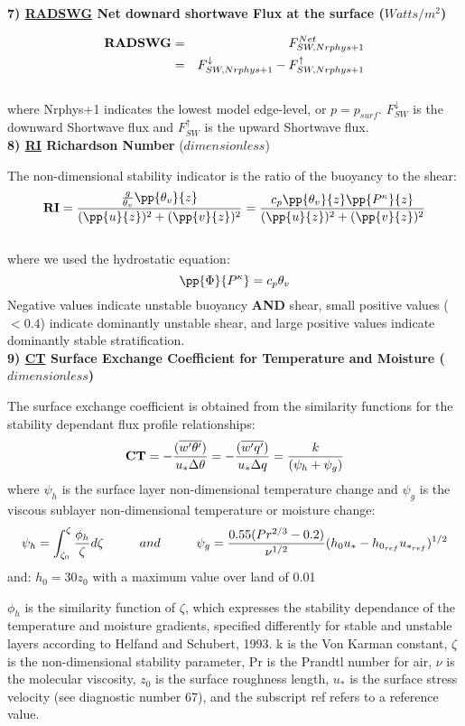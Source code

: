 {\bf 7) \underline {RADSWG} Net downard shortwave Flux at the surface ($Watts/m^2$)}

\begin{eqnarray*}
{\bf RADSWG} & =  & F_{SW,Nrphys+1}^{Net} \\
             & =  & F_{SW,Nrphys+1}^\downarrow - F_{SW,Nrphys+1}^\uparrow
\end{eqnarray*}
\\
where Nrphys+1 indicates the lowest model edge-level, or $p = p_{surf}$.
$F_{SW}^\downarrow$ is
the downward Shortwave flux and $F_{SW}^\uparrow$ is the upward Shortwave flux.
\\


\noindent
{\bf 8)  \underline {RI} Richardson Number} ($dimensionless$)

\noindent
The non-dimensional stability indicator is the ratio of the buoyancy to the shear:
\[
{\bf RI} = { { {g \over \theta_v} \pp {\theta_v}{z} } \over { (\pp{u}{z})^2 + (\pp{v}{z})^2 } }
 =  {  {c_p \pp{\theta_v}{z} \pp{P^ \kappa}{z} } \over { (\pp{u}{z})^2 + (\pp{v}{z})^2 } }
\]
\\
where we used the hydrostatic equation: 
\[
{\pp{\Phi}{P^ \kappa}} = c_p \theta_v
\]
Negative values indicate unstable buoyancy {\bf{AND}} shear, small positive values ($<0.4$)
indicate dominantly unstable shear, and large positive values indicate dominantly stable
stratification.
\\

\noindent
{\bf 9)  \underline {CT}  Surface Exchange Coefficient for Temperature and Moisture ($dimensionless$) }

\noindent
The surface exchange coefficient is obtained from the similarity functions for the stability
 dependant flux profile relationships:
\[
{\bf CT} = -{( {\overline{w^{\prime}\theta^{\prime}}}) \over {u_* \Delta \theta }} = 
-{( {\overline{w^{\prime}q^{\prime}}}) \over {u_* \Delta q }} = 
{ k \over { (\psi_{h} + \psi_{g}) } } 
\]
where $\psi_h$ is the surface layer non-dimensional temperature change and $\psi_g$ is the
viscous sublayer non-dimensional temperature or moisture change:
\[
\psi_{h} = {\int_{\zeta_{0}}^{\zeta} {\phi_{h} \over \zeta} d \zeta} \hspace{1cm} and 
\hspace{1cm} \psi_{g} = { 0.55 (Pr^{2/3} - 0.2) \over \nu^{1/2} } 
(h_{0}u_{*} - h_{0_{ref}}u_{*_{ref}})^{1/2}
\]
and:
$h_{0} = 30z_{0}$ with a maximum value over land of 0.01

\noindent
$\phi_h$ is the similarity function of $\zeta$, which expresses the stability dependance of
the temperature and moisture gradients, specified differently for stable and unstable 
layers according to Helfand and Schubert, 1993. k is the Von Karman constant, $\zeta$ is the 
non-dimensional stability parameter, Pr is the Prandtl number for air, $\nu$ is the molecular 
viscosity, $z_{0}$ is the surface roughness length, $u_*$ is the surface stress velocity 
(see diagnostic number 67), and the subscript ref refers to a reference value.
\\

